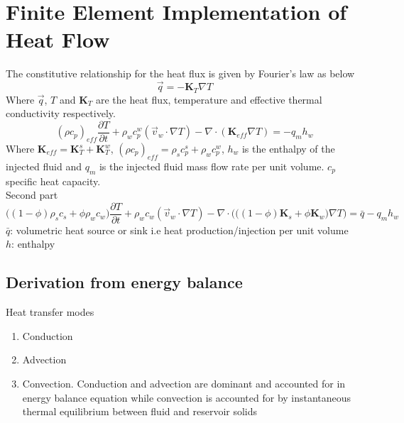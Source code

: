 \section{Finite Element Implementation of Heat Flow}
The constitutive relationship for the heat flux is given by Fourier's law as below
\begin{equation}
\vec{q}=-\mathbf{K}_T\nabla T
\end{equation}
Where $\vec{q}$, $T$ and $\mathbf{K}_T$ are the heat flux, temperature and effective thermal conductivity respectively.
%
%
%
\begin{equation}
(\rho c_p )_{eff}\frac{\partial T}{\partial t} + \rho_wc_p^w(\vec{v}_w\cdot\nabla T)-\nabla\cdot(\mathbf{K}_{eff}\nabla T)=-q_m h_w
\end{equation}
%
Where
$\mathbf{K}_{eff} = \mathbf{K}_T^s +\mathbf{K}_T^w$, $(\rho c_p )_{eff} = \rho_s c_p ^s +\rho_w c_p ^w$, $h_w$ is the enthalpy of the injected fluid and $q_m$ is the injected fluid mass flow rate per unit volume. $c_p$ specific heat capacity.
%
%
\\
Second part \\
\begin{equation}
\Big((1-\phi)\rho_s c_s + \phi \rho_wc_w\Big)\frac{\partial T}{\partial t} + \rho_wc_w(\vec{v}_w\cdot\nabla T)-\nabla\cdot\Big(\big((1-\phi)\mathbf{K}_{s}+\phi \mathbf{K}_w\big)\nabla T\Big)=\bar{q}-q_m h_w
\end{equation}
%
$\bar{q}$: volumetric heat source or sink i.e heat production/injection per unit volume\\
%
$h$: enthalpy\\
%
\subsection{Derivation from energy balance}
Heat transfer modes
\begin{enumerate}
\item Conduction
\item Advection
\item Convection. Conduction and advection are dominant and accounted for in energy balance equation while convection is accounted for by instantaneous thermal equilibrium between fluid and reservoir solids \cite{spillette}
\end{enumerate}


